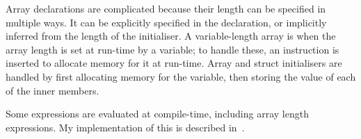 \documentclass[00-main.tex]{subfiles}
\begin{document}

Array declarations are complicated because their length can be specified in multiple ways.
It can be explicitly specified in the declaration, or implicitly inferred from the length of the initialiser.
A variable-length array is when the array length is set at run-time by a variable; to handle these, an instruction is inserted to allocate memory for it at run-time.
Array and struct initialisers are handled by first allocating memory for the variable, then storing the value of each of the inner members.

Some expressions are evaluated at compile-time, including array length expressions.
My implementation of this is described in~.
\end{document}
